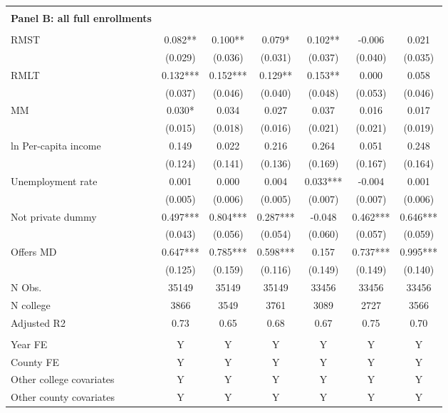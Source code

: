 \documentclass[12pt]{article}%
\begin{document}
\begin{table}[!htbp]
\begin{threeparttable}
\begin{tabular}{@{\extracolsep{-6pt}}lcccccc}
\hline  \\[-1.8ex] 
\textbf{Panel B: all full enrollments}\\  \\[-1.8ex] 
RMST & 0.082** & 0.100** & 0.079* & 0.102** & -0.006 & 0.021 \\
& (0.029) & (0.036) & (0.031) & (0.037) & (0.040) & (0.035) \\
RMLT & 0.132*** & 0.152*** & 0.129** & 0.153** & 0.000 & 0.058 \\
& (0.037) & (0.046) & (0.040) & (0.048) & (0.053) & (0.046) \\
MM & 0.030* & 0.034 & 0.027 & 0.037 & 0.016 & 0.017 \\
& (0.015) & (0.018) & (0.016) & (0.021) & (0.021) & (0.019) \\
ln Per-capita income & 0.149 & 0.022 & 0.216 & 0.264 & 0.051 & 0.248 \\
& (0.124) & (0.141) & (0.136) & (0.169) & (0.167) & (0.164) \\
Unemployment rate & 0.001 & 0.000 & 0.004 & 0.033*** & -0.004 & 0.001 \\
& (0.005) & (0.006) & (0.005) & (0.007) & (0.007) & (0.006) \\
Not private dummy & 0.497*** & 0.804*** & 0.287*** & -0.048 & 0.462*** &
0.646*** \\
& (0.043) & (0.056) & (0.054) & (0.060) & (0.057) & (0.059) \\
Offers MD & 0.647*** & 0.785*** & 0.598*** & 0.157 & 0.737*** &
0.995*** \\
& (0.125) & (0.159) & (0.116) & (0.149) & (0.149) & (0.140) \\
\hline
N Obs. & 35149 & 35149 & 35149 & 33456 & 33456 & 33456 \\
N college & 3866 & 3549 & 3761 & 3089 & 2727 & 3566 \\
Adjusted R2 & 0.73 & 0.65 & 0.68 & 0.67 & 0.75 & 0.70 \\
\midrule  \\[-1.8ex]   
Year FE & Y & Y & Y & Y & Y & Y \\
County FE & Y & Y & Y & Y & Y & Y \\
Other college covariates & Y & Y & Y & Y & Y & Y \\
Other county covariates & Y & Y & Y & Y & Y & Y \\
\bottomrule
\end{tabular}

  \end{threeparttable}
\end{table}
\FloatBarrier
\end{document}
